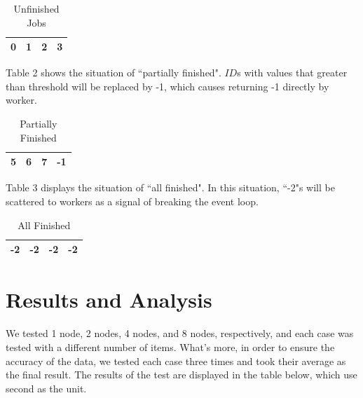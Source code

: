 \documentclass[12pt, a4paper, twocolumn]{article}
\begin{document}
    \begin{table}[h]
        \centering
        \caption{Unfinished Jobs}
        \begin{tabular}{|c|c|c|c|}
            \hline
            0 & 1 & 2 & 3\\
            \hline
        \end{tabular}
    \end{table}

    Table 2 shows the situation of ``partially finished". $ID$s with values that greater than threshold will be replaced by -1, which causes returning -1 directly by worker.

    \begin{table}[h]
        \centering
        \caption{Partially Finished}
        \begin{tabular}{|c|c|c|c|}
            \hline
            5 & 6 & 7 & -1\\
            \hline
        \end{tabular}
    \end{table}

    Table 3 displays the situation of ``all finished". In this situation, ``-2"s will be scattered to workers as a signal of breaking the event loop.

    \begin{table}[h]
        \centering
        \caption{All Finished}
        \small
        \begin{tabular}{|c|c|c|c|}
            \hline
            -2 & -2 & -2 & -2\\
            \hline
        \end{tabular}
    \end{table}

    \section{Results and Analysis}

    We tested 1 node, 2 nodes, 4 nodes, and 8 nodes, respectively, and each case was tested with a different number of items. What's more, in order to ensure the accuracy of the data, we tested each case three times and took their average as the final result. The results of the test are displayed in the table below, which use second as the unit.
\end{document}
